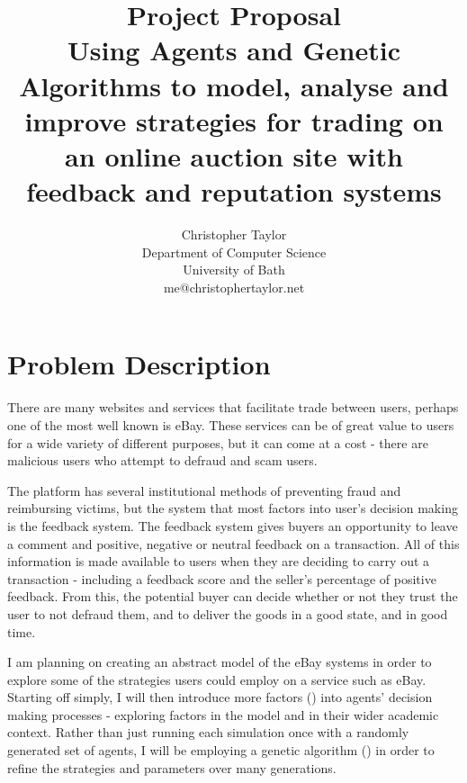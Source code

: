 \documentclass{article}
\title{Project Proposal \\ Using Agents and Genetic Algorithms to model, analyse and improve strategies for trading on an online auction site with feedback and reputation systems}
\author{Christopher Taylor \\ Department of Computer Science \\ University of Bath \\ me@christophertaylor.net}
\begin{document}
\maketitle
{}
\listoftodos
\section{Problem Description}
\label{sec:problem-description}
There are many websites and services that facilitate trade between users, perhaps one of the most well known is eBay. These services can be of great value to users for a wide variety of different purposes, but it can come at a cost - there are malicious users who attempt to defraud and scam users.

The platform has several institutional methods of preventing fraud and reimbursing victims, but the system that most factors into user's decision making is the feedback system. The feedback system gives buyers an opportunity to leave a comment and positive, negative or neutral feedback on a transaction. All of this information is made available to users when they are deciding to carry out a transaction - including a feedback score and the seller's percentage of positive feedback. From this, the potential buyer can decide whether or not they trust the user to not defraud them, and to deliver the goods in a good state, and in good time.\cite{gregg2006role}

I am planning on creating an abstract model of the eBay systems in order to explore some of the strategies users could employ on a service such as eBay. Starting off simply, I will then introduce more factors () into agents' decision making processes - exploring factors in the model and in their wider academic context. Rather than just running each simulation once with a randomly generated set of agents, I will be employing a genetic algorithm () in order to refine the strategies and parameters over many generations.
\end{document}
